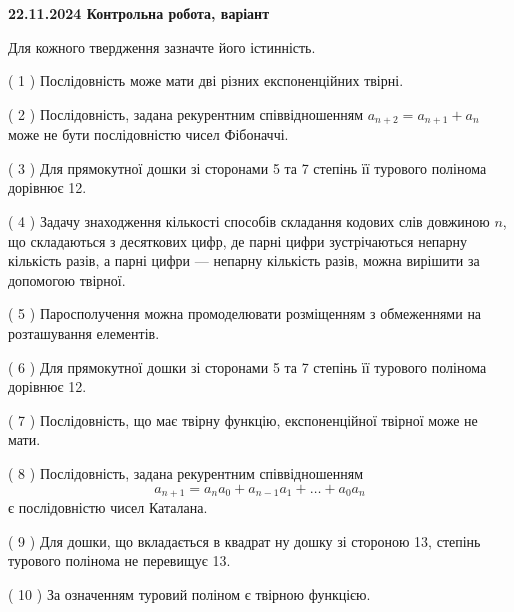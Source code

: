 \documentclass[12pt, ukrainian]{article}
\begin{document}
\vspace{4mm}
\newpage
\begin {large}

\textbf{22.11.2024 Контрольна робота, варіант  }\par


{
Для кожного твердження зазначте його істинність.\par
\vspace{2mm}
( 1 ) Послідовність може мати дві різних експоненційних твірні.%

( 2 ) Послідовність, задана рекурентним співвідношенням $a_{n+2}=a_{n+1}+a_{n}$ може не бути послідовністю чисел Фібоначчі.%

( 3 ) Для прямокутної дошки зі сторонами 5 та 7 степінь її турового полінома дорівнює 12.%

( 4 ) Задачу знаходження кількості способів складання кодових слів довжиною $n$, що складаються з десяткових цифр, де парні цифри зустрічаються непарну кількість разів, а парні цифри — непарну кількість разів, можна вирішити за допомогою твірної.%

( 5 ) Паросполучення можна промоделювати розміщенням з обмеженнями на розташування елементів.%

( 6 ) Для прямокутної дошки зі сторонами 5 та 7 степінь її турового полінома дорівнює 12.%

( 7 ) Послідовність, що має твірну функцію, експоненційної твірної може не мати.%

( 8 ) Послідовність, задана рекурентним співвідношенням $$a_{n+1}=a_{n}a_{0}+a_{n-1}a_{1}+\ldots+a_0a_{n}$$ є послідовністю чисел Каталана.%

( 9 ) Для дошки, що вкладається в квадрат ну дошку зі стороною 13, степінь турового полінома не перевищує 13.%

( 10 ) За означенням туровий поліном є твірною функцією.%


\vspace{5mm}
}
\end {large}
\end{document}
